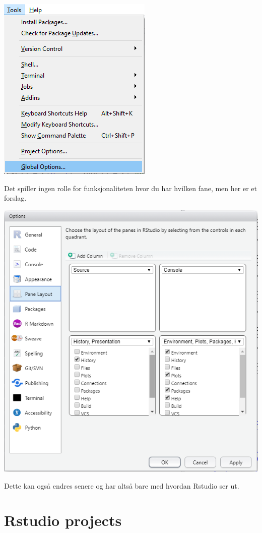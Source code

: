 \documentclass[
  letterpaper,
  DIV=11,
  numbers=noendperiod]{scrreprt}
\theoremstyle{definition}
\theoremstyle{remark}
\begin{document}
\includegraphics{./images/oppsett1.png}

Det spiller ingen rolle for funksjonaliteten hvor du har hvilken fane,
men her er et forslag.

\includegraphics{./images/oppsett2.png}

Dette kan også endres senere og har altså bare med hvordan Rstudio ser
ut.

\hypertarget{rstudio-projects}{%
\section{Rstudio projects}\label{rstudio-projects}}
\end{document}

